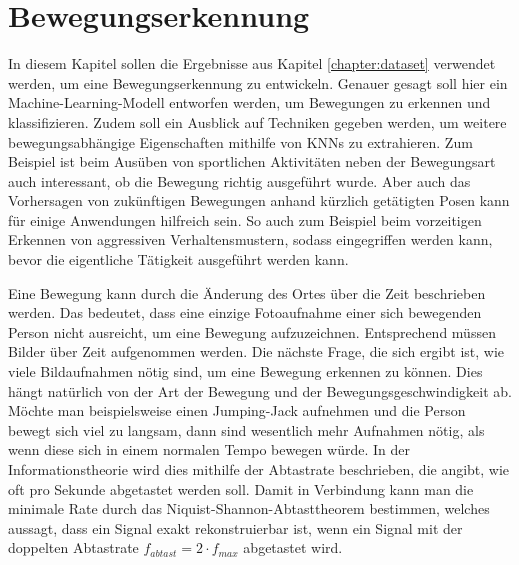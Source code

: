 \chapter{Bewegungserkennung}\label{chapter:motion-detection}
In diesem Kapitel sollen die Ergebnisse aus Kapitel \ref{chapter:dataset}
verwendet werden, um eine Bewegungserkennung zu entwickeln. Genauer gesagt soll
hier ein Machine-Learning-Modell entworfen werden, um Bewegungen zu
erkennen und klassifizieren. Zudem soll ein Ausblick auf Techniken gegeben
werden, um weitere bewegungsabhängige Eigenschaften mithilfe von KNNs zu
extrahieren. Zum Beispiel ist beim Ausüben von sportlichen Aktivitäten neben der
Bewegungsart auch interessant, ob die Bewegung richtig ausgeführt wurde. Aber
auch das Vorhersagen von zukünftigen Bewegungen anhand kürzlich getätigten Posen
kann für einige Anwendungen hilfreich sein. So auch zum Beispiel beim
vorzeitigen Erkennen von aggressiven Verhaltensmustern, sodass eingegriffen
werden kann, bevor die eigentliche Tätigkeit ausgeführt werden kann. 

Eine Bewegung kann durch die Änderung des Ortes über die Zeit beschrieben
werden. Das bedeutet, dass eine einzige Fotoaufnahme einer sich bewegenden
Person nicht ausreicht, um eine Bewegung aufzuzeichnen. Entsprechend müssen
Bilder über Zeit aufgenommen werden. Die nächste Frage, die sich ergibt ist, wie
viele Bildaufnahmen nötig sind, um eine Bewegung erkennen zu können. Dies hängt
natürlich von der Art der Bewegung und der Bewegungsgeschwindigkeit ab. Möchte
man beispielsweise einen Jumping-Jack aufnehmen und die Person bewegt sich viel
zu langsam, dann sind wesentlich mehr Aufnahmen nötig, als wenn diese sich in
einem normalen Tempo bewegen würde. In der Informationstheorie wird dies
mithilfe der Abtastrate beschrieben, die angibt, wie oft pro Sekunde abgetastet
werden soll.  Damit in Verbindung kann man die minimale Rate durch das
Niquist-Shannon-Abtasttheorem bestimmen, welches aussagt, dass ein Signal exakt
rekonstruierbar ist, wenn ein Signal mit der doppelten Abtastrate $f_{abtast} =
2 \cdot f_{max}$ abgetastet wird.

